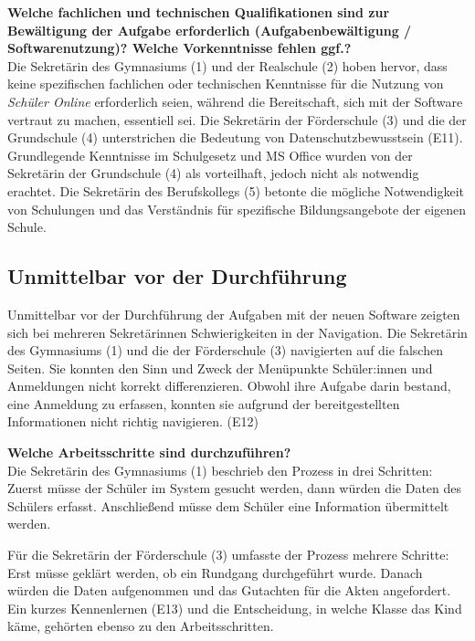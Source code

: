 \textbf{Welche fachlichen und technischen Qualifikationen sind zur Bewältigung der Aufgabe erforderlich (Aufgabenbewältigung / Softwarenutzung)? Welche Vorkenntnisse fehlen ggf.?}\\
Die Sekretärin des Gymnasiums (1) und der Realschule (2) hoben hervor, dass keine spezifischen fachlichen oder technischen Kenntnisse für die Nutzung von \textit{Schüler Online} erforderlich seien, während die Bereitschaft, sich mit der Software vertraut zu machen, essentiell sei. Die Sekretärin der Förderschule (3) und die der Grundschule (4) unterstrichen die Bedeutung von Datenschutzbewusstsein (E11). Grundlegende Kenntnisse im Schulgesetz und MS Office wurden von der Sekretärin der Grundschule (4) als vorteilhaft, jedoch nicht als notwendig erachtet. Die Sekretärin des Berufskollegs (5) betonte die mögliche Notwendigkeit von Schulungen und das Verständnis für spezifische Bildungsangebote der eigenen Schule.

\subsection{Unmittelbar vor der Durchführung}
Unmittelbar vor der Durchführung der Aufgaben mit der neuen Software zeigten sich bei mehreren Sekretärinnen Schwierigkeiten in der Navigation. Die Sekretärin des Gymnasiums (1) und die der Förderschule (3) navigierten auf die falschen Seiten. Sie konnten den Sinn und Zweck der Menüpunkte \glqq Schüler:innen\grqq{} und \glqq Anmeldungen\grqq{} nicht korrekt differenzieren. Obwohl ihre Aufgabe darin bestand, eine Anmeldung zu erfassen, konnten sie aufgrund der bereitgestellten Informationen nicht richtig navigieren. (E12)

\textbf{Welche Arbeitsschritte sind durchzuführen?}\\
Die Sekretärin des Gymnasiums (1) beschrieb den Prozess in drei Schritten: Zuerst müsse der Schüler im System gesucht werden, dann würden die Daten des Schülers erfasst. Anschließend müsse dem Schüler eine Information übermittelt werden.

Für die Sekretärin der Förderschule (3) umfasste der Prozess mehrere Schritte: Erst müsse geklärt werden, ob ein Rundgang durchgeführt wurde. Danach würden die Daten aufgenommen und das Gutachten für die Akten angefordert. Ein kurzes Kennenlernen (E13) und die Entscheidung, in welche Klasse das Kind käme, gehörten ebenso zu den Arbeitsschritten. 

